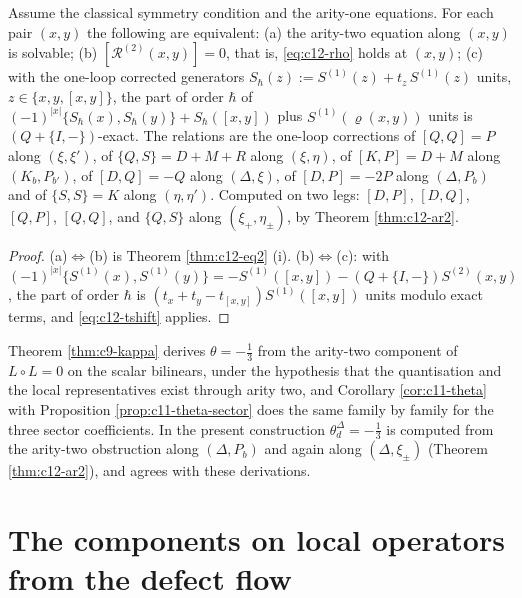 \begin{theorem}
\label{thm:c12-algebra}
Assume the classical symmetry condition and the arity-one equations. For each pair $(x,y)$ the following are equivalent: (a) the arity-two equation along $(x,y)$ is solvable; (b) $[\mathcal R^{(2)}(x,y)]=0$, that is, \eqref{eq:c12-rho} holds at $(x,y)$; (c) with the one-loop corrected generators $S_\hbar(z):=S^{(1)}(z)+t_z\,S^{(1)}(z)$ units, $z\in\{x,y,[x,y]\}$, the part of order $\hbar$ of $(-1)^{|x|}\{S_\hbar(x),S_\hbar(y)\}+S_\hbar([x,y])$ plus $S^{(1)}(\varrho(x,y))$ units is $(Q+\{I,-\})$-exact. The relations are the one-loop corrections of $[Q,Q]=P$ along $(\xi,\xi')$, of $\{Q,S\}=D+M+R$ along $(\xi,\eta)$, of $[K,P]=D+M$ along $(K_b,P_{b'})$, of $[D,Q]=-Q$ along $(\Delta,\xi)$, of $[D,P]=-2P$ along $(\Delta,P_b)$ and of $\{S,S\}=K$ along $(\eta,\eta')$. Computed on two legs: $[D,P]$, $[D,Q]$, $[Q,P]$, $[Q,Q]$, and $\{Q,S\}$ along $(\xi_+,\eta_\pm)$, by Theorem \ref{thm:c12-ar2}.
\end{theorem}

\begin{proof}
(a)$\Leftrightarrow$(b) is Theorem \ref{thm:c12-eq2} (i). (b)$\Leftrightarrow$(c): with $(-1)^{|x|}\{S^{(1)}(x),S^{(1)}(y)\}=-S^{(1)}([x,y])-(Q+\{I,-\})S^{(2)}(x,y)$, the part of order $\hbar$ is $(t_x+t_y-t_{[x,y]})S^{(1)}([x,y])$ units modulo exact terms, and \eqref{eq:c12-tshift} applies.
\end{proof}

\begin{remark}
\label{rem:c12-thetacheck}
Theorem \ref{thm:c9-kappa} derives $\theta=-\tfrac13$ from the arity-two component of $L\circ L=0$ on the scalar bilinears, under the hypothesis that the quantisation and the local representatives exist through arity two, and Corollary \ref{cor:c11-theta} with Proposition \ref{prop:c11-theta-sector} does the same family by family for the three sector coefficients. In the present construction $\theta^\Delta_d=-\tfrac13$ is computed from the arity-two obstruction along $(\Delta,P_b)$ and again along $(\Delta,\xi_\pm)$ (Theorem \ref{thm:c12-ar2}), and agrees with these derivations.
\end{remark}

\section{The components on local operators from the defect flow}

